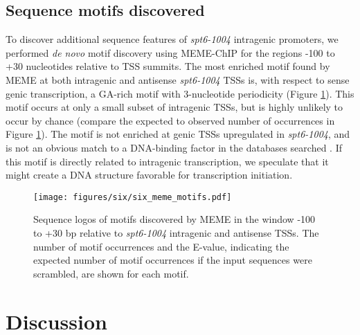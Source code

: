 \subsection{Sequence motifs discovered}

To discover additional sequence features of \textit{spt6-1004} intragenic promoters, we performed \textit{de novo} motif discovery using MEME-ChIP \citep{machanick2011} for the regions -100 to +30 nucleotides relative to TSS summits.
The most enriched motif found by MEME at both intragenic and antisense \textit{spt6-1004} TSSs is, with respect to sense genic transcription, a GA-rich motif with 3-nucleotide periodicity (Figure \ref{fig:six_meme_motifs}).
This motif occurs at only a small subset of intragenic TSSs, but is highly unlikely to occur by chance (compare the expected to observed number of occurrences in Figure \ref{fig:six_meme_motifs}).
The motif is not enriched at genic TSSs upregulated in \textit{spt6-1004}, and is not an obvious match to a DNA-binding factor in the databases searched \citep{deboer2011,macisaac2006,newburger2008,pachkov2013,teixeira2017,zhu1999,weirauch2014}.
If this motif is directly related to intragenic transcription, we speculate that it might create a DNA structure favorable for transcription initiation.

\begin{figure}[h]
    \centering
    \texttt{[image: figures/six/six\_meme\_motifs.pdf]}
    \caption[Sequence logos of motifs discovered by MEME upstream of \textit{spt6-1004}-induced intragenic and antisense TSSs.]{Sequence logos of motifs discovered by MEME \citep{bailey2015} in the window -100 to +30 bp relative to \textit{spt6-1004} intragenic and antisense TSSs. The number of motif occurrences and the E-value, indicating the expected number of motif occurrences if the input sequences were scrambled, are shown for each motif.}
    \label{fig:six_meme_motifs}
\end{figure}

\section{Discussion}

